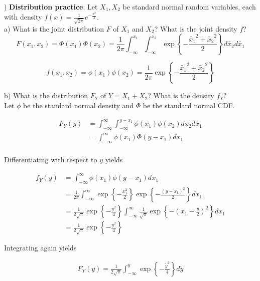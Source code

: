 \documentclass[12pt,english]{article}
\begin{document}
\vspace{1em}
) \textbf{Distribution practice}: Let $X_{1}, X_{2}$ be standard normal random variables, each with density $f(x) = \frac{1}{\sqrt{2\pi}} e^{-\frac{x^{2}}{2}}$. \\
a) What is the joint distribution $F$ of $X_{1}$ and $X_{2}$? What is the joint density $f$? \\

$$ F(x_{1}, x_{2}) = \Phi(x_{1}) \Phi(x_{2}) =  \frac{1}{2\pi} \int_{-\infty}^{x_{1}} \int_{-\infty}^{x_{2}} \exp \left\{ -\frac{\widetilde{x_{1}}^{2} + \widetilde{x_{2}}^{2}}{2} \right\} d\widetilde{x_{2}} d\widetilde{x_{1}} $$

$$ f(x_{1}, x_{2}) = \phi(x_{1}) \phi(x_{2}) = \frac{1}{2\pi} \exp \left\{ -\frac{\widetilde{x_{1}}^{2} + \widetilde{x_{2}}^{2}}{2} \right\} $$

\vspace{1em}
\noindent
b) What is the distribution $F_{Y}$ of $Y = X_{1} + X_{2}$? What is the density $f_{Y}$? \\

Let $\phi$ be the standard normal density and $\Phi$ be the standard normal CDF.

\begin{align*}
F_{Y}(y) & = \int_{-\infty}^{\infty} \int_{-\infty}^{y - x_{1}} \phi(x_{1}) \phi(x_{2}) dx_{2} dx_{1} \\
& = \int_{-\infty}^{\infty} \phi(x_{1}) \Phi(y - x_{1}) dx_{1} \\
\end{align*}

Differentiating with respect to $y$ yields

\begin{align*}
f_{Y}(y) & = \int_{-\infty}^{\infty} \phi(x_{1}) \phi(y - x_{1}) dx_{1} \\
& = \frac{1}{2\pi} \int_{-\infty}^{\infty} \exp \left\{ -\frac{x_{1}^{2}}{2}\right\} \exp \left\{ -\frac{(y - x_{1})^{2}}{2}\right\} dx_{1} \\
& = \frac{1}{2\sqrt{\pi}} \exp \left\{ -\frac{y^{2}}{4} \right\} \int_{-\infty}^{\infty} \frac{1}{\sqrt{\pi}} \exp \left\{ - \left(x_{1} - \frac{y}{2} \right)^{2}\right\} dx_{1} \\
& = \frac{1}{2\sqrt{\pi}} \exp \left\{ -\frac{y^{2}}{4} \right\}
\end{align*}

Integrating again yields

\begin{align*}
F_{Y}(y) = \frac{1}{2\sqrt{\pi}} \int_{-\infty}^{y} \exp \left\{ -\frac{\widetilde{y}^{2}}{4} \right\} d \widetilde{y}
\end{align*}
\end{document}
